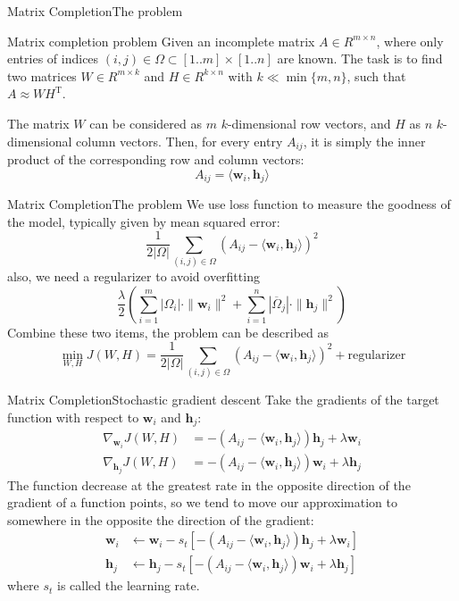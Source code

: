\documentclass{beamer}
\renewcommand{\vec}{\mathbf}
\begin{document}
  \begin{frame}{Matrix Completion}{The problem}
    \begin{block}{Matrix completion problem}
    Given an incomplete matrix $A \in R^{m \times n}$, where only entries of indices $(i, j) \in \Omega \subset [1 .. m] \times [1 .. n]$ are known. The task is to find two matrices $W \in R^{m \times k}$ and $H \in R^{k \times  n}$ with $k \ll \min\{m,n\}$, such that $A \approx WH^{\text{T}}$.
    \end{block}
    \pause
    The matrix $W$ can be considered as $m$ $k$-dimensional row vectors, and $H$ as $n$ $k$-dimensional column vectors. Then, for every entry $A_{ij}$, it is simply the inner product of the corresponding row and column vectors:
  $$ A_{ij} = \langle \vec{w}_i, \vec{h}_j \rangle$$
  \end{frame}

  \begin{frame}{Matrix Completion}{The problem}
    We use loss function to measure the goodness of the model, typically given by mean squared error:
    $$ \frac{1}{2|\Omega|} \sum_{(i, j) \in \Omega} (A_{ij} - \langle \vec{w}_i, \vec{h}_j \rangle)^2 $$
    also, we need a regularizer to avoid overfitting
    $$ \frac{\lambda}{2} ( \sum_{i = 1}^m | \Omega_i | \cdot \|\vec{w}_i\|^2 + \sum_{i=1}^n | \overline{\Omega}_j| \cdot \|\vec{h}_j\|^2) $$
    Combine these two items, the problem can be described as
    $$\min_{W, H} J(W, H) = \frac{1}{2|\Omega|} \sum_{(i, j) \in \Omega} (A_{ij} - \langle \vec{w}_i, \vec{h}_j \rangle)^2 + \text{regularizer}$$
  \end{frame}

  \begin{frame}{Matrix Completion}{Stochastic gradient descent}
    Take the gradients of the target function with respect to $\vec{w}_i$ and $\vec{h}_j$:
    \begin{align*}
      \nabla_{\vec{w}_i}J(W, H) &= -(A_{ij} - \langle \vec{w}_i, \vec{h}_j \rangle) \vec{h}_j + \lambda \vec{w}_i \\
      \nabla_{\vec{h}_j}J(W, H) &= -(A_{ij} - \langle \vec{w}_i, \vec{h}_j \rangle) \vec{w}_i + \lambda \vec{h}_j
    \end{align*}
    \pause
    The function decrease at the greatest rate in the opposite direction of the gradient of a function points, so we tend to move our approximation to somewhere in the opposite the direction of the gradient:
    \begin{align}
      \vec{w}_i &\leftarrow \vec{w}_i - s_t [-(A_{ij} - \langle \vec{w}_i, \vec{h}_j \rangle) \vec{h}_j + \lambda \vec{w}_i] \\
      \vec{h}_j &\leftarrow \vec{h}_j - s_t [-(A_{ij} - \langle \vec{w}_i, \vec{h}_j \rangle) \vec{w}_i + \lambda \vec{h}_j]
    \end{align}
    where $s_t$ is called the learning rate.
  \end{frame}
\end{document}
